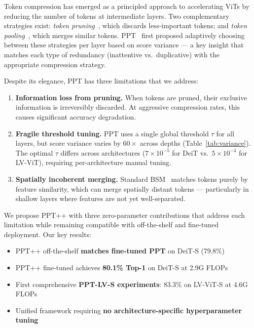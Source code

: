 \documentclass[10pt,twocolumn,letterpaper]{article}
\begin{document}
Token compression has emerged as a principled approach to accelerating ViTs by
reducing the number of tokens at intermediate layers. Two complementary
strategies exist: \textit{token pruning}~\cite{liang2022evit, rao2021dynamicvit},
which discards less-important tokens; and \textit{token pooling}~\cite{bolya2023tome},
which merges similar tokens. PPT~\cite{wu2023ppt} first proposed adaptively
choosing between these strategies per layer based on score variance --- a key
insight that matches each type of redundancy (inattentive vs.\ duplicative)
with the appropriate compression strategy.

Despite its elegance, PPT has three limitations that we address:

\begin{enumerate}
\item \textbf{Information loss from pruning.} When tokens are pruned, their
exclusive information is irreversibly discarded. At aggressive compression
rates, this causes significant accuracy degradation.

\item \textbf{Fragile threshold tuning.} PPT uses a single global threshold
$\tau$ for all layers, but score variance varies by $60\times$ across depths
(Table~\ref{tab:variance}). The optimal $\tau$ differs across architectures
($7{\times}10^{-5}$ for DeiT vs.\ $5{\times}10^{-4}$ for LV-ViT), requiring
per-architecture manual tuning.

\item \textbf{Spatially incoherent merging.} Standard BSM~\cite{bolya2023tome}
matches tokens purely by feature similarity, which can merge spatially distant
tokens --- particularly in shallow layers where features are not yet
well-separated.
\end{enumerate}

We propose PPT++ with three zero-parameter contributions that address each
limitation while remaining compatible with off-the-shelf and fine-tuned
deployment. Our key results:

\begin{itemize}
\item PPT++ off-the-shelf \textbf{matches fine-tuned PPT} on DeiT-S (79.8\%)
\item PPT++ fine-tuned achieves \textbf{80.1\% Top-1} on DeiT-S at 2.9G FLOPs
\item First comprehensive \textbf{PPT-LV-S experiments}: 83.3\% on LV-ViT-S at 4.6G FLOPs
\item Unified framework requiring \textbf{no architecture-specific hyperparameter tuning}
\end{itemize}
\end{document}
